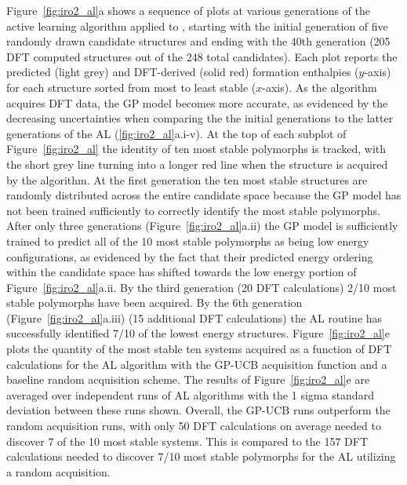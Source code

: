 %
Figure~\ref{fig:iro2_al}a shows a sequence of plots at various generations of the active learning algorithm applied to \IrOthree,
starting with the initial generation of five randomly drawn candidate structures and ending with the 40th generation
(\num{205} DFT computed structures out of the \num{248} total candidates).
%
Each plot reports the predicted (light grey) and DFT-derived (solid red) formation enthalpies ($y$-axis) for each structure sorted from most to least stable ($x$-axis).
%
As the algorithm acquires DFT data, the GP model becomes more accurate, as evidenced by the decreasing uncertainties when comparing the the initial generations to the latter generations of the AL (\ref{fig:iro2_al}a.i-v).
%
At the top of each subplot of Figure~\ref{fig:iro2_al} the identity of ten most stable polymorphs is tracked,
with the short grey line turning into a longer red line when the structure is acquired by the algorithm.
%
At the first generation the ten most stable structures are randomly distributed across the entire candidate space because the GP model has not been trained sufficiently to correctly identify the most stable polymorphs.
%
After only three generations (Figure~\ref{fig:iro2_al}a.ii) the GP model is sufficiently trained to predict all of the 10 most stable polymorphs as being low energy configurations, as evidenced by the fact that their predicted energy ordering within the candidate space has shifted towards the low energy portion of Figure~\ref{fig:iro2_al}a.ii.
%
By the third generation (\num{20} DFT calculations) \num{2/10} most stable polymorphs have been acquired.
%
By the 6th generation (Figure~\ref{fig:iro2_al}a.iii) (\num{15} additional DFT calculations) the AL routine has successfully identified \num{7/10} of the lowest energy structures.
%
Figure~\ref{fig:iro2_al}e plots the quantity of the most stable ten systems acquired as a function of DFT calculations for the AL algorithm with the GP-UCB acquisition function and a baseline random acquisition scheme.
%
The results of Figure~\ref{fig:iro2_al}e are averaged over independent runs of AL algorithms with the 1 sigma standard deviation between these runs shown.
%
Overall, the GP-UCB runs outperform the random acquisition runs, with only \num{50} DFT calculations on average needed to discover \num{7} of the \num{10} most stable systems.
%
This is compared to the \num{157} DFT calculations needed to discover \num{7/10} most stable polymorphs for the AL utilizing a random acquisition.

